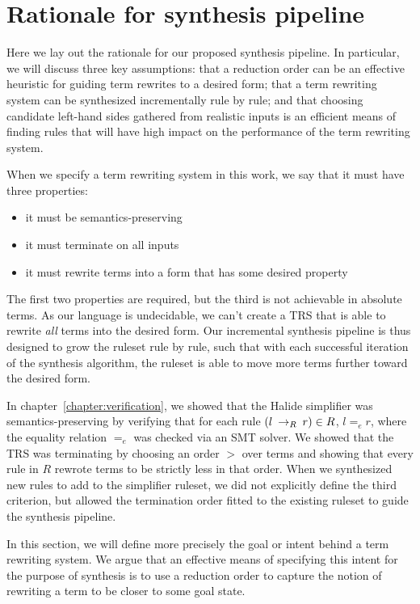 \section{Rationale for synthesis pipeline}

Here we lay out the rationale for our proposed synthesis pipeline. In particular, we will discuss three key assumptions: that a reduction order can be an effective heuristic for guiding term rewrites to a desired form; that a term rewriting system can be synthesized incrementally rule by rule; and that choosing candidate left-hand sides gathered from realistic inputs is an efficient means of finding rules that will have high impact on the performance of the term rewriting system.

When we specify a term rewriting system in this work, we say that it must have three properties:

\begin{itemize}
    \item it must be semantics-preserving
    \item it must terminate on all inputs
    \item it must rewrite terms into a form that has some desired property
\end{itemize}

The first two properties are required, but the third is not achievable in absolute terms. As our language is undecidable, we can't create a TRS that is able to rewrite \emph{all} terms into the desired form. Our incremental synthesis pipeline is thus designed to grow the ruleset rule by rule, such that with each successful iteration of the synthesis algorithm, the ruleset is able to move more terms further toward the desired form.

In chapter~\ref{chapter:verification}, we showed that the Halide simplifier was semantics-preserving by verifying that for each rule $(l \:\rightarrow_{R}\: r) \in R$, $l =_e r$, where the equality relation $=_e$ was checked via an SMT solver. We showed that the TRS was terminating by choosing an order $>$ over terms and showing that every rule in $R$ rewrote terms to be strictly less in that order. When we synthesized new rules to add to the simplifier ruleset, we did not explicitly define the third criterion, but allowed the termination order fitted to the existing ruleset to guide the synthesis pipeline. 

In this section, we will define more precisely the goal or intent behind a term rewriting system. We argue that an effective means of specifying this intent for the purpose of synthesis is to use a reduction order to capture the notion of rewriting a term to be closer to some goal state.

